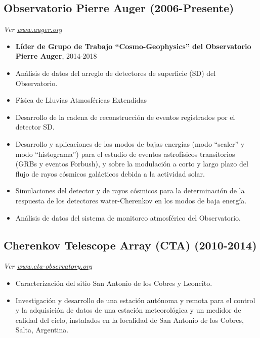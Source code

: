 \subsection*{Observatorio Pierre Auger (2006-Presente)}
{\small{\textit{Ver \href{http://www.auger.org/}{www.auger.org}}}}
\begin{itemize}
\item {\bf{Líder de Grupo de Trabajo ``Cosmo-Geophysics'' del Observatorio Pierre Auger}}, 2014-2018
\item Análisis de datos del arreglo de detectores de superficie (SD) del Observatorio.
\item Física de Lluvias Atmosféricas Extendidas
\item Desarrollo de la cadena de reconstrucción de eventos registrados por el detector SD.
\item Desarrollo y aplicaciones de los modos de bajas energías (modo ``scaler'' y modo ``histograma'') para el estudio de eventos astrofísicos transitorios (GRBs y eventos Forbush), y sobre la modulación a corto y largo plazo del flujo de rayos cósmicos galácticos debida a la actividad solar.
\item Simulaciones del detector y de rayos cósmicos para la determinación de la respuesta de los detectores water-Cherenkov en los modos de baja energía.
\item Análisis de datos del sistema de monitoreo atmosférico del Observatorio.
\end{itemize}
\subsection*{Cherenkov Telescope Array (CTA) (2010-2014)}
{\small{\textit{Ver \href{http://www.cta-observatory.org}{www.cta-observatory.org}}}}
\begin{itemize}
\item Caracterización del sitio San Antonio de los Cobres y Leoncito. %
\item Investigación y desarrollo de una estación autónoma y remota para el control y la adquisición de datos de una estación meteorológica y un medidor de calidad del cielo, instalados en la localidad de San Antonio de los Cobres, Salta, Argentina.
\end{itemize}
\fi


